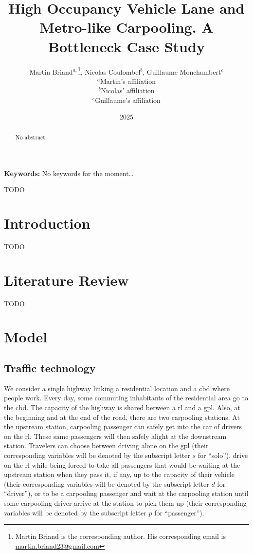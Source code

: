 \documentclass[english, a4paper]{article}
\title{High Occupancy Vehicle Lane and Metro-like Carpooling. A Bottleneck Case Study}
\author{Martin Briand$^{a,}$\footnote{Martin Briand is the corresponding author. His corresponding email is \href{mailto:martin.briand23@gmail.com}{martin.briand23@gmail.com}}, Nicolas Coulombel$^{b}$, Guillaume Monchambert$^{c}$\\
\small $^{a}$Martin’s affiliation\\
\small $^{b}$Nicolas’ affiliation\\
\small $^{c}$Guillaume’s affiliation}
\date{2025}
\theoremstyle{plain}
\theoremstyle{definition}
\theoremstyle{remark}
\newcommand{\keywords}[1]
{
    \small
    \textbf{Keywords:} #1
    \vspace{0.2cm}
}
\begin{document}
\maketitle

\begin{abstract}
    No abstract
\end{abstract}

\keywords{No keywords for the moment…}
\alert{TODO} %

\section{Introduction}
\alert{TODO} %

\section{Literature Review}
\alert{TODO} %

\section{Model}
\subsection{Traffic technology}

We consider a single highway linking a residential location and a \acrfull{cbd} where people work. Every day, some commuting inhabitants of the residential area go to the \acrshort{cbd}. The capacity of the highway is shared between a \acrfull{rl} and a \acrfull{gpl}. Also, at the beginning and at the end of the road, there are two carpooling stations. At the upstream station, carpooling passenger can safely get into the car of drivers on the \acrshort{rl}. These same passengers will then safely alight at the downstream station. Travelers can choose between driving alone on the \acrshort{gpl} (their corresponding variables will be denoted by the subscript letter $s$ for ``solo''), drive on the \acrshort{rl} while being forced to take all passengers that would be waiting at the upstream station when they pass it, if any, up to the capacity of their vehicle (their corresponding variables will be denoted by the subscript letter $d$ for ``driver''), or to be a carpooling passenger and wait at the carpooling station until some carpooling driver arrive at the station to pick them up (their corresponding variables will be denoted by the subscript letter $p$ for ``passenger'').
\end{document}
